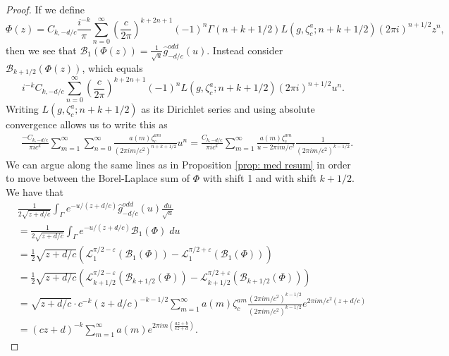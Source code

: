 \documentclass[10pt,a4paper]{amsart}
\begin{document}
\begin{proof}
If we define
\[\Phi(z) =C_{k, -d/c}\frac{i^{-k}}{\pi} \sum_{n=0}^\infty \left(\frac{c}{2\pi}\right)^{k+2n+1} (-1)^n\Gamma(n+k+1/2)L(g, \zeta_c^{a}; n+k+1/2)(2\pi i)^{n+1/2}z^n,
\]
then we see that $\mathcal{B}_1(\Phi(z)) = \frac{1}{\sqrt{u}}\widehat{g}_{-d/c}^{odd}(u)$. Instead consider $\mathcal{B}_{k+1/2}(\Phi(z))$, which equals 
\[i^{-k} C_{k, -d/c}\sum_{n=0}^\infty \left(\frac{c}{2\pi}\right)^{k+2n+1} (-1)^nL(g, \zeta_c^{a}; n+k+1/2)(2\pi i)^{n+1/2}u^n.
\]
Writing $L(g, \zeta_c^{a}; n+k+1/2)$ as its Dirichlet series and using absolute convergence allows us to write this as 
\begin{align*}&\frac{-C_{k, -d/c}}{\pi i c^k} \sum_{m=1}^\infty \sum_{n=0}^\infty \frac{a(m)\zeta_c^{am}}{(2\pi i m/c^2)^{n+k+1/2}}u^n = \frac{C_{k, -d/c}}{\pi i c^k}\sum_{m=1}^\infty  \frac{a(m)\zeta_c^{am}}{u - 2\pi i m/c^2}\frac{1}{(2\pi i m/c^2)^{k-1/2}}.
\end{align*}
We can argue along the same lines as in Proposition \ref{prop: med resum} in order to move between the Borel-Laplace sum of $\Phi$ with shift 1 and with shift $k+1/2$. We have that
\begin{align*}
&\frac{1}{2\sqrt{z+d/c}} \int_{\Gamma}e^{-u/(z+d/c)}\widehat{g}_{-d/c}^{odd}(u)\frac{du}{\sqrt{u}}\\
&= \frac{1}{2\sqrt{z+d/c}} \int_{\Gamma}e^{-u/(z+d/c)}\mathcal{B}_1(\Phi)\;du\\
&= \frac{1}{2}\sqrt{z+d/c}\left( \mathcal{L}_{1}^{\pi/2-\varepsilon}(\mathcal{B}_1(\Phi)) - \mathcal{L}_{1}^{\pi/2+\varepsilon}(\mathcal{B}_1(\Phi))\right) \\
&= \frac{1}{2}\sqrt{z+d/c}\left( \mathcal{L}_{k+1/2}^{\pi/2-\varepsilon}(\mathcal{B}_{k+1/2}(\Phi)) - \mathcal{L}_{k+1/2}^{\pi/2+\varepsilon}(\mathcal{B}_{k+1/2}(\Phi))\right)\\
&= \sqrt{z+d/c}\cdot c^{-k} (z+d/c)^{-k-1/2} \sum_{m=1}^\infty a(m)\zeta_c^{am}\frac{(2\pi i m/c^2)^{k-1/2}}{(2\pi i m/c^2)^{k-1/2}} e^{2\pi i m/c^2(z+d/c)}\\
&= (cz+d)^{-k}\sum_{m=1}^\infty a(m) e^{2\pi i m\left(\frac{az+b}{cz+d}\right)}.
\end{align*}


\end{proof}
\end{document}
